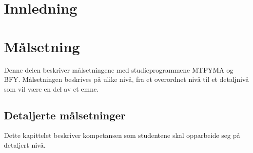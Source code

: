 \documentclass[a4paper, oneside, 12pt]{memoir}
\begin{document}
\frontmatter
\tableofcontents

\part{Innledning}

\mainmatter



\part{Målsetning}

Denne delen beskriver målsetningene med studieprogrammene MTFYMA og BFY. Målsetningen beskrives på ulike nivå, fra et overordnet nivå til et detaljnivå som vil være en del av et emne.



\chapter{Detaljerte målsetninger}
Dette kapittelet beskriver kompetansen som studentene skal opparbeide seg på detaljert nivå.
\end{document}
